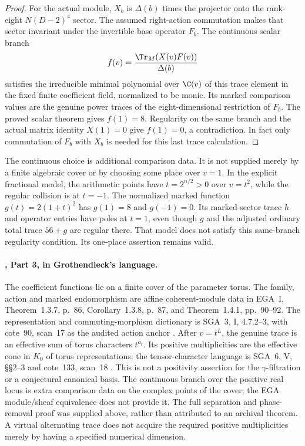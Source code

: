 \begin{proof}
For the actual module, $X_b$ is $\Delta(b)$ times the
projector onto the rank-eight $N(D-2)^4$ sector.
The assumed right-action commutation makes that sector
invariant under the invertible base operator $F_b$.
The continuous scalar branch
\[
 f(v)=\frac{\Tr_M(X(v)F(v))}{\Delta(b)}
\]
satisfies the irreducible minimal polynomial over
$\C(v)$ of this trace element in the fixed finite
coefficient field, normalized to be monic.
Its marked comparison values are the genuine power
traces of the eight-dimensional restriction of $F_b$.
The proved scalar theorem gives $f(1)=8$.
Regularity on the same branch and the actual matrix
identity $X(1)=0$ give $f(1)=0$, a contradiction.
In fact only commutation of $F_b$ with $X_b$ is needed
for this last trace calculation.
\end{proof}

The continuous choice is additional comparison data.
It is not supplied merely by a finite algebraic cover
or by choosing some place over $v=1$.
In the explicit fractional model, the arithmetic points
have $t=2^{n/2}>0$ over $v=t^2$, while the regular
collision is at $t=-1$.
The normalized marked function $g(t)=2(1+t)^2$ has
$g(1)=8$ and $g(-1)=0$.
Its marked-sector trace $h$ and operator entries have
poles at $t=1$, even though $g$ and the adjusted
ordinary total trace $56+g$ are regular there.
That model does not satisfy this same-branch regularity
condition. Its one-place assertion remains valid.

\paragraph{, Part 3, in Grothendieck's language.}
The coefficient functions lie on a finite cover of the
parameter torus. The family, action and marked
endomorphism are affine coherent-module data in
EGA~I, Theorem~1.3.7, p.~86, Corollary~1.3.8, p.~87,
and Theorem~1.4.1, pp.~90--92.
The representation and commuting-morphism dictionary
is SGA~3, I, 4.7.2--3, with cote~90, scan~17 as the
audited action anchor \cite{EGA,SGA3,Archive}.
After $v=t^L$, the genuine trace is an effective sum
of torus characters $t^{a_i}$.
Its positive multiplicities are the effective cone in
$K_0$ of torus representations; the tensor-character
language is SGA~6, V, \S\S2--3 and cote~133, scan~18
\cite{SGA6,Archive}.
This is not a positivity assertion for the
$\gamma$-filtration or a conjectural canonical basis.
The continuous branch over the positive real locus
is extra comparison data on the complex points of
the cover; the EGA module/sheaf equivalence does not
provide it. The full separation and phase-removal
proof was supplied above, rather than attributed to
an archival theorem. A virtual alternating trace
does not acquire the required positive multiplicities
merely by having a specified numerical dimension.
